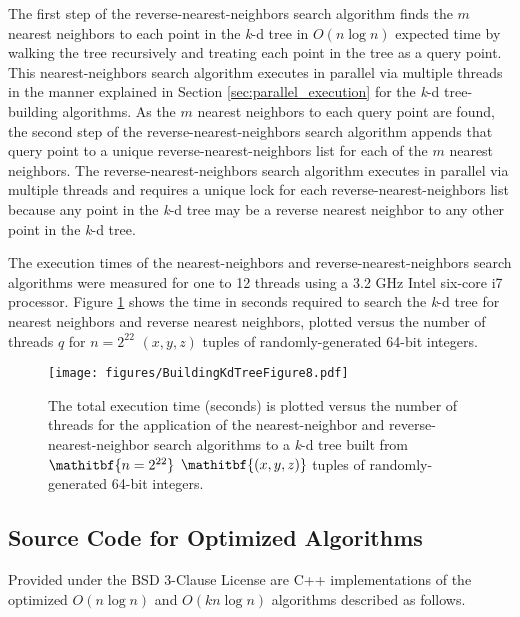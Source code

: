 \documentclass{sig-alternate}
\begin{document}
The first step of the reverse-nearest-neighbors search algorithm finds the $m$ nearest neighbors to each point in the \emph{k}-d tree in $O\left(n \log n\right)$ expected time by walking the tree recursively and treating each point in the tree as a query point. This nearest-neighbors search algorithm executes in parallel via multiple threads in the manner explained in Section \ref{sec:parallel_execution} for the \emph{k}-d tree-building algorithms. As the $m$ nearest neighbors to each query point are found, the second step of the reverse-nearest-neighbors search algorithm appends that query point to a unique reverse-nearest-neighbors list for each of the $m$ nearest neighbors. The reverse-nearest-neighbors search algorithm executes in parallel via multiple threads and requires a unique lock for each reverse-nearest-neighbors list because any point in the \emph{k}-d tree may be a reverse nearest neighbor to any other point in the \emph{k}-d tree.

The execution times of the nearest-neighbors and reverse-nearest-neighbors search algorithms were measured for one to 12 threads using a 3.2 GHz Intel six-core i7 processor.  Figure \ref{fig:Neighbors} shows the time in seconds required to search the \emph{k}-d tree for nearest neighbors and reverse nearest neighbors, plotted versus the number of threads $q$ for $n=2^{22}$ $\left(x,y,z \right)$ tuples of randomly-generated 64-bit integers.

\begin{figure}[h]
\centering
\centerline{\texttt{[image: figures/BuildingKdTreeFigure8.pdf]}}
\caption{The total execution time (seconds) is plotted versus the number of threads for the application of the nearest-neighbor and reverse-nearest-neighbor search algorithms to a \emph{k}-d tree built from $\mathitbf{n = 2^{22}}$ $\mathitbf{\left(x,y,z \right)}$ tuples of randomly-generated 64-bit integers.}
\label{fig:Neighbors}
\end{figure}

\subsection{Source Code for Optimized Algorithms}
\label{sec:source_code}

Provided under the BSD 3-Clause License are C++ implementations of the optimized $O\left(n \log n\right)$ and $O\left(kn \log n\right)$ algorithms described as follows.
\end{document}
